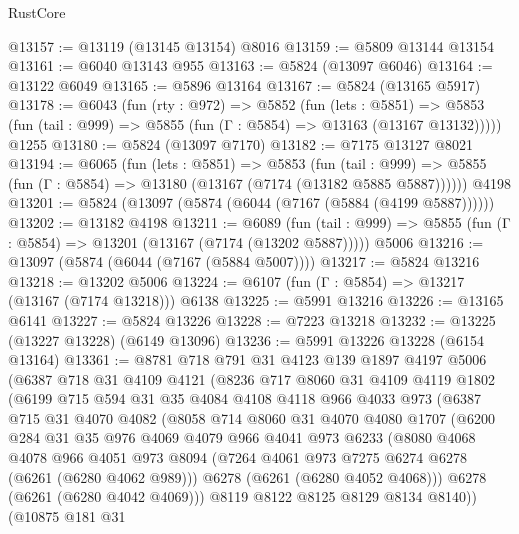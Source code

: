 \begin{lexlean}{RustCore}
\begin{coremodule}
@13157 := @13119 (@13145 @13154) @8016
@13159 := @5809 @13144 @13154
@13161 := @6040 @13143 @955
@13163 := @5824 (@13097 @6046)
@13164 := @13122 @6049
@13165 := @5896 @13164
@13167 := @5824 (@13165 @5917)
@13178 := @6043
    (fun (rty : @972) =>
    @5852
      (fun (lets : @5851) =>
      @5853 (fun (tail : @999) => @5855 (fun (Γ : @5854) => @13163 (@13167 @13132)))))
    @1255
@13180 := @5824 (@13097 @7170)
@13182 := @7175 @13127 @8021
@13194 := @6065
    (fun (lets : @5851) =>
    @5853
      (fun (tail : @999) =>
      @5855 (fun (Γ : @5854) => @13180 (@13167 (@7174 (@13182 @5885 @5887))))))
    @4198
@13201 := @5824 (@13097 (@5874 (@6044 (@7167 (@5884 (@4199 @5887))))))
@13202 := @13182 @4198
@13211 := @6089
    (fun (tail : @999) => @5855 (fun (Γ : @5854) => @13201 (@13167 (@7174 (@13202 @5887)))))
    @5006
@13216 := @13097 (@5874 (@6044 (@7167 (@5884 @5007))))
@13217 := @5824 @13216
@13218 := @13202 @5006
@13224 := @6107 (fun (Γ : @5854) => @13217 (@13167 (@7174 @13218))) @6138
@13225 := @5991 @13216
@13226 := @13165 @6141
@13227 := @5824 @13226
@13228 := @7223 @13218
@13232 := @13225 (@13227 @13228) (@6149 @13096)
@13236 := @5991 @13226 @13228 (@6154 @13164)
@13361 := @8781
    @718
    @791
    @31
    @4123
    @139
    @1897
    @4197
    @5006
    (@6387
      @718
      @31
      @4109
      @4121
      (@8236
        @717
        @8060
        @31
        @4109
        @4119
        @1802
        (@6199
          @715
          @594
          @31
          @35
          @4084
          @4108
          @4118
          @966
          @4033
          @973
          (@6387
            @715
            @31
            @4070
            @4082
            (@8058
              @714
              @8060
              @31
              @4070
              @4080
              @1707
              (@6200
                @284
                @31
                @35
                @976
                @4069
                @4079
                @966
                @4041
                @973
                @6233
                (@8080
                  @4068
                  @4078
                  @966
                  @4051
                  @973
                  @8094
                  (@7264 @4061 @973 @7275 @6274 @6278 (@6261 (@6280 @4062 @989)))
                  @6278
                  (@6261 (@6280 @4052 @4068)))
                @6278
                (@6261 (@6280 @4042 @4069)))
              @8119
              @8122
              @8125
              @8129
              @8134
              @8140))
          (@10875
            @181
            @31

\end{coremodule}
\end{lexlean}
